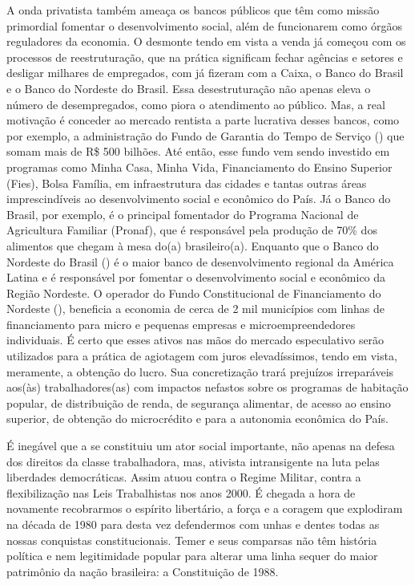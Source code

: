 A onda privatista também ameaça os bancos públicos que têm como missão
primordial fomentar o desenvolvimento social, além de funcionarem como
órgãos reguladores da economia. O desmonte tendo em vista a venda já
começou com os processos de reestruturação, que na prática significam
fechar agências e setores e desligar milhares de empregados, com já
fizeram com a Caixa, o Banco do Brasil e o Banco do Nordeste do Brasil.
Essa desestruturação não apenas eleva o número de desempregados, como
piora o atendimento ao público. Mas, a real motivação é conceder ao
mercado rentista a parte lucrativa desses bancos, como por exemplo, a
administração do Fundo de Garantia do Tempo de Serviço () que somam
mais de R\$ 500 bilhões. Até então, esse fundo vem sendo investido em
programas como Minha Casa, Minha Vida, Financiamento do Ensino Superior
(Fies), Bolsa Família, em infraestrutura das cidades e tantas outras
áreas imprescindíveis ao desenvolvimento social e econômico do País. Já
o Banco do Brasil, por exemplo, é o principal fomentador do Programa
Nacional de Agricultura Familiar (Pronaf), que é responsável pela
produção de 70\% dos alimentos que chegam à mesa do(a) brasileiro(a).
Enquanto que o Banco do Nordeste do Brasil () é o maior banco de
desenvolvimento regional da América Latina e é responsável por fomentar
o desenvolvimento social e econômico da Região Nordeste. O operador do
Fundo Constitucional de Financiamento do Nordeste (), beneficia a
economia de cerca de 2 mil municípios com linhas de financiamento para
micro e pequenas empresas e microempreendedores individuais. É certo que
esses ativos nas mãos do mercado especulativo serão utilizados para a
prática de agiotagem com juros elevadíssimos, tendo em vista, meramente,
a obtenção do lucro. Sua concretização trará prejuízos irreparáveis
aos(às) trabalhadores(as) com impactos nefastos sobre os programas de
habitação popular, de distribuição de renda, de segurança alimentar, de
acesso ao ensino superior, de obtenção do microcrédito e para a
autonomia econômica do País.

É inegável que a  se constituiu um ator social importante, não apenas
na defesa dos direitos da classe trabalhadora, mas, ativista
intransigente na luta pelas liberdades democráticas. Assim atuou contra
o Regime Militar, contra a flexibilização nas Leis Trabalhistas nos anos
2000. É chegada a hora de novamente recobrarmos o espírito libertário, a
força e a coragem que explodiram na década de 1980 para desta vez
defendermos com unhas e dentes todas as nossas conquistas
constitucionais. Temer e seus comparsas não têm história política e nem
legitimidade popular para alterar uma linha sequer do maior patrimônio
da nação brasileira: a Constituição de 1988.

